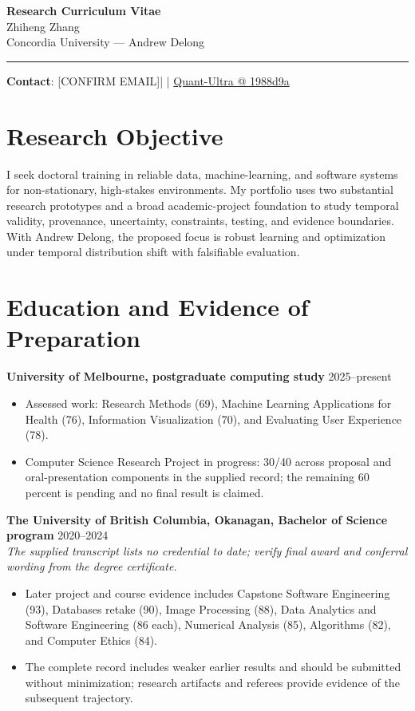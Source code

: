 \documentclass[11pt]{article}
\makeatletter
\newcommand{\ApplicantName}{Zhiheng Zhang}
\newcommand{\ApplicantEmail}{[CONFIRM EMAIL]}
\newcommand{\ApplicantPhone}{[CONFIRM PHONE]}
\newcommand{\ApplicantGitHub}{\href{https://github.com/zhiheng-zhang-Mera/Quant-Ultra/tree/1988d9a8530da91a8158de864d098ea869098923}{Quant-Ultra @ 1988d9a}}
\makeatother
\begin{document}
\begin{center}
{\LARGE\bfseries Research Curriculum Vitae}\\[0.25em]
{\large \ApplicantName}\\
Concordia University --- Andrew Delong
\end{center}
\vspace{0.35em}\hrule\vspace{0.65em}

\textbf{Contact}: \ApplicantEmail\quad | \quad \ApplicantPhone\quad | \quad \ApplicantGitHub

\section*{Research Objective}
I seek doctoral training in reliable data, machine-learning, and software systems for non-stationary, high-stakes environments. My portfolio uses two substantial research prototypes and a broad academic-project foundation to study temporal validity, provenance, uncertainty, constraints, testing, and evidence boundaries. With Andrew Delong, the proposed focus is robust learning and optimization under temporal distribution shift with falsifiable evaluation.

\section*{Education and Evidence of Preparation}
\textbf{University of Melbourne, postgraduate computing study} \hfill 2025--present
\begin{itemize}
\item Assessed work: Research Methods (69), Machine Learning Applications for Health (76), Information Visualization (70), and Evaluating User Experience (78).
\item Computer Science Research Project in progress: 30/40 across proposal and oral-presentation components in the supplied record; the remaining 60 percent is pending and no final result is claimed.
\end{itemize}

\textbf{The University of British Columbia, Okanagan, Bachelor of Science program} \hfill 2020--2024\\
\textit{The supplied transcript lists no credential to date; verify final award and conferral wording from the degree certificate.}
\begin{itemize}
\item Later project and course evidence includes Capstone Software Engineering (93), Databases retake (90), Image Processing (88), Data Analytics and Software Engineering (86 each), Numerical Analysis (85), Algorithms (82), and Computer Ethics (84).
\item The complete record includes weaker earlier results and should be submitted without minimization; research artifacts and referees provide evidence of the subsequent trajectory.
\end{itemize}
\end{document}
